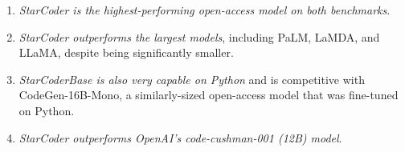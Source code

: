\documentclass[10pt]{article} %
\begin{document}
\begin{enumerate}

  \item \emph{StarCoder is the highest-performing open-access model on both benchmarks}.
   \item \emph{StarCoder outperforms the largest models}, including PaLM, LaMDA, and LLaMA, despite being significantly smaller.

   \item \emph{StarCoderBase is also very capable on Python} and is competitive with CodeGen-16B-Mono, a similarly-sized open-access model that was fine-tuned on Python. 

   \item \emph{StarCoder outperforms OpenAI's code-cushman-001 (12B) model}.


\end{enumerate}



\end{document}
